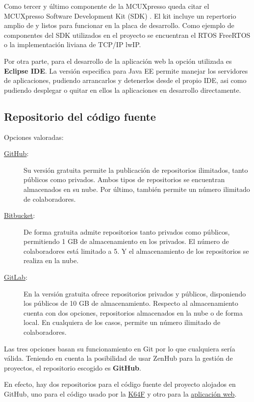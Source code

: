 Como tercer y último componente de la  MCUXpresso queda
citar el MCUXpresso Software Development Kit (SDK) \cite{webpage:sdk}. El kit
incluye un repertorio amplio de  y
 listos para funcionar en la placa de desarrollo.
Como ejemplo de componentes del SDK utilizados en el proyecto se encuentran el 
RTOS FreeRTOS o la implementación liviana de TCP/IP lwIP.

Por otra parte, para el desarrollo de la aplicación web la opción utilizada es
\textbf{Eclipse IDE}. La versión especifica para Java EE permite manejar los
servidores de aplicaciones, pudiendo arrancarlos y detenerlos desde el propio
IDE, asi como pudiendo desplegar o quitar en ellos la aplicaciones en desarrollo
directamente.

\subsection{Repositorio del código fuente}{\label{sec:ide}}
Opciones valoradas:
\begin{description}
  \item[\href{https://github.com/}{GitHub}:] Su versión gratuita permite la
  publicación de repositorios ilimitados, tanto públicos como privados. Ambos
  tipos de repositorios se encuentran almacenados en su nube. Por último,
  también permite un número ilimitado de colaboradores.
  \item[\href{https://bitbucket.org/}{Bitbucket}:] De forma gratuita admite
  repositorios tanto privados como públicos, permitiendo 1 GB de almacenamiento
  en los privados. El número de colaboradores está limitado a 5. Y el
  almacenamiento de los repositorios se realiza en la nube.
  \item[\href{https://about.gitlab.com/}{GitLab}:] En la versión gratuita ofrece
  repositorios privados y públicos, disponiendo los públicos de 10 GB de
  almacenamiento. Respecto al almacenamiento cuenta con dos opciones,
  repositorios almacenados en la nube o de forma local. En cualquiera de los
  casos, permite un número ilimitado de colaboradores.
\end{description}

Las tres opciones basan su funcionamiento en Git por lo que cualquiera sería
válida. Teniendo en cuenta la posibilidad de usar ZenHub para la gestión de
proyectos, el repositorio escogido es \textbf{GitHub}.

En efecto, hay dos repositorios para el código fuente del proyecto alojados en 
GitHub, uno para el código usado por la
\href{https://github.com/rpc0027/k64f-lwip}{K64F} y otro para la
\href{https://github.com/rpc0027/web-app}{aplicación web}.

